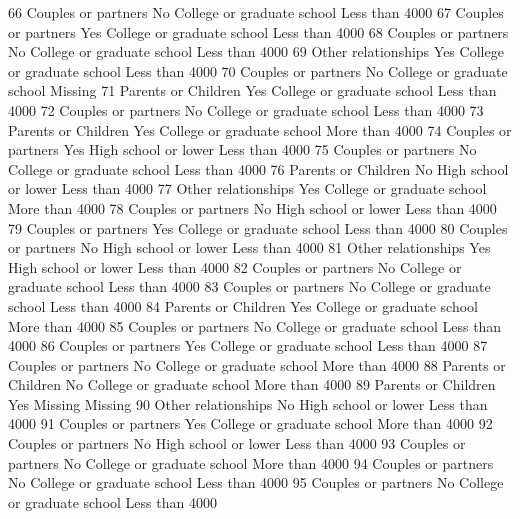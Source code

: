 \documentclass[
  letterpaper,
  DIV=11,
  numbers=noendperiod]{scrreprt}
\newenvironment{Shaded}{\begin{snugshade}}{\end{snugshade}}
\newcommand{\NormalTok}[1]{\textcolor[rgb]{0.00,0.23,0.31}{#1}}
\begin{document}
\begin{Shaded}
\begin{Highlighting}[]
\NormalTok{66  Couples or partners       No College or graduate school Less than 4000}
\NormalTok{67  Couples or partners      Yes College or graduate school Less than 4000}
\NormalTok{68  Couples or partners       No College or graduate school Less than 4000}
\NormalTok{69  Other relationships      Yes College or graduate school Less than 4000}
\NormalTok{70  Couples or partners       No College or graduate school        Missing}
\NormalTok{71  Parents or Children      Yes College or graduate school Less than 4000}
\NormalTok{72  Couples or partners       No College or graduate school Less than 4000}
\NormalTok{73  Parents or Children      Yes College or graduate school More than 4000}
\NormalTok{74  Couples or partners      Yes       High school or lower Less than 4000}
\NormalTok{75  Couples or partners       No College or graduate school Less than 4000}
\NormalTok{76  Parents or Children       No       High school or lower Less than 4000}
\NormalTok{77  Other relationships      Yes College or graduate school More than 4000}
\NormalTok{78  Couples or partners       No       High school or lower Less than 4000}
\NormalTok{79  Couples or partners      Yes College or graduate school Less than 4000}
\NormalTok{80  Couples or partners       No       High school or lower Less than 4000}
\NormalTok{81  Other relationships      Yes       High school or lower Less than 4000}
\NormalTok{82  Couples or partners       No College or graduate school Less than 4000}
\NormalTok{83  Couples or partners       No College or graduate school Less than 4000}
\NormalTok{84  Parents or Children      Yes College or graduate school More than 4000}
\NormalTok{85  Couples or partners       No College or graduate school Less than 4000}
\NormalTok{86  Couples or partners      Yes College or graduate school Less than 4000}
\NormalTok{87  Couples or partners       No College or graduate school More than 4000}
\NormalTok{88  Parents or Children       No College or graduate school More than 4000}
\NormalTok{89  Parents or Children      Yes                    Missing        Missing}
\NormalTok{90  Other relationships       No       High school or lower Less than 4000}
\NormalTok{91  Couples or partners      Yes College or graduate school More than 4000}
\NormalTok{92  Couples or partners       No       High school or lower Less than 4000}
\NormalTok{93  Couples or partners       No College or graduate school More than 4000}
\NormalTok{94  Couples or partners       No College or graduate school Less than 4000}
\NormalTok{95  Couples or partners       No College or graduate school Less than 4000}

\end{Highlighting}
\end{Shaded}
\end{document}

